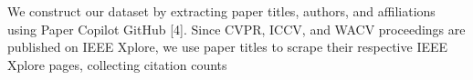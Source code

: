 \documentclass{article}
\begin{document}
We construct our dataset by extracting paper titles, authors, and affiliations using Paper Copilot GitHub [4]. Since CVPR, ICCV, and WACV proceedings are published on IEEE Xplore, we use paper titles to scrape their respective IEEE Xplore pages, collecting citation counts
\end{document}
